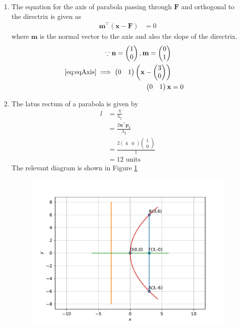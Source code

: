 \documentclass[12pt]{article}
\providecommand{\brak}[1]{\ensuremath{\left(#1\right)}}
\newcommand{\myvec}[1]{\ensuremath{\begin{pmatrix}#1\end{pmatrix}}}
\let\vec\mathbf
\begin{document}
\begin{enumerate}
\begin{enumerate}
\item The equation for the axis of parabola passing through $\vec{F}$ and orthogonal to the directrix is given as  
\begin{align}
	\label{eq:eqAxis}
	\vec{m}^\top\brak{\vec{x}-\vec{F}} &= 0
\end{align}
where $\vec{m}$ is the normal vector to the axis and also the slope of the directrix.
\begin{align}
	\because \vec{n} = \myvec{1 \\ 0 }, \vec{m} = \myvec{0 \\ 1} \\
	\eqref{eq:eqAxis} \implies \myvec{0 & 1}\myvec{\vec{x} - \myvec{3 \\ 0}} \\
	\myvec{0 & 1}\vec{x} &= 0 
\end{align}
\item The latus rectum of a parabola is given by 
\begin{align}
	l &= \frac{\eta}{\lambda_2} \\ 
	 &= \frac{2\vec{u}^\top\vec{p_1}}{\lambda_2} \\
	 &= \frac{2\myvec{6 & 0}\myvec{1 \\ 0}}{1} \\
	 &= 12 \text{ units }
\end{align}
The relevant diagram is shown in Figure \ref{fig:Fig1}
\begin{figure}[!h]
	\begin{center}
		\includegraphics[width=\columnwidth]{./figs/problem1.pdf}
	\end{center}
\caption{}
\label{fig:Fig1}
\end{figure}
\end{enumerate}
\end{enumerate}
\end{document}
